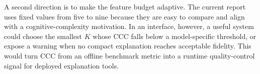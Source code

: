 \documentclass[sigconf,nonacm]{acmart}
\begin{document}
A second direction is to make the feature budget adaptive. The current report
uses fixed values from five to nine because they are easy to compare and align
with a cognitive-complexity motivation. In an interface, however, a useful
system could choose the smallest $K$ whose CCC falls below a model-specific
threshold, or expose a warning when no compact explanation reaches acceptable
fidelity. This would turn CCC from an offline benchmark metric into a runtime
quality-control signal for deployed explanation tools.

\clearpage


\end{document}
